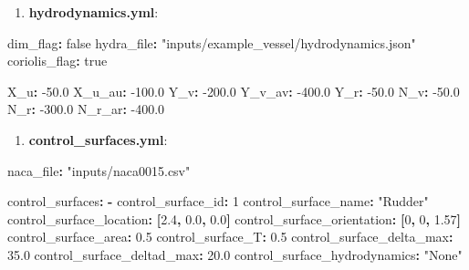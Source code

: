 \documentclass[
  letterpaper,
  DIV=11,
  numbers=noendperiod]{scrreprt}
\newenvironment{Shaded}{\begin{snugshade}}{\end{snugshade}}
\newcommand{\AttributeTok}[1]{\textcolor[rgb]{0.40,0.45,0.13}{#1}}
\newcommand{\CharTok}[1]{\textcolor[rgb]{0.13,0.47,0.30}{#1}}
\newcommand{\DecValTok}[1]{\textcolor[rgb]{0.68,0.00,0.00}{#1}}
\newcommand{\FloatTok}[1]{\textcolor[rgb]{0.68,0.00,0.00}{#1}}
\newcommand{\FunctionTok}[1]{\textcolor[rgb]{0.28,0.35,0.67}{#1}}
\newcommand{\KeywordTok}[1]{\textcolor[rgb]{0.00,0.23,0.31}{\textbf{#1}}}
\newcommand{\StringTok}[1]{\textcolor[rgb]{0.13,0.47,0.30}{#1}}
\providecommand{\tightlist}{%
  \setlength{\itemsep}{0pt}\setlength{\parskip}{0pt}}\usepackage{longtable,booktabs,array}
\begin{document}
\begin{enumerate}
\def\labelenumi{\arabic{enumi}.}
\setcounter{enumi}{3}
\tightlist
\item
  \textbf{hydrodynamics.yml}:
\end{enumerate}

\begin{Shaded}
\begin{Highlighting}[]
\FunctionTok{dim\_flag}\KeywordTok{:}\AttributeTok{ }\CharTok{false}
\FunctionTok{hydra\_file}\KeywordTok{:}\AttributeTok{ }\StringTok{"inputs/example\_vessel/hydrodynamics.json"}
\FunctionTok{coriolis\_flag}\KeywordTok{:}\AttributeTok{ }\CharTok{true}

\FunctionTok{X\_u}\KeywordTok{:}\AttributeTok{ }\FloatTok{{-}50.0}
\FunctionTok{X\_u\_au}\KeywordTok{:}\AttributeTok{ }\FloatTok{{-}100.0}
\FunctionTok{Y\_v}\KeywordTok{:}\AttributeTok{ }\FloatTok{{-}200.0}
\FunctionTok{Y\_v\_av}\KeywordTok{:}\AttributeTok{ }\FloatTok{{-}400.0}
\FunctionTok{Y\_r}\KeywordTok{:}\AttributeTok{ }\FloatTok{{-}50.0}
\FunctionTok{N\_v}\KeywordTok{:}\AttributeTok{ }\FloatTok{{-}50.0}
\FunctionTok{N\_r}\KeywordTok{:}\AttributeTok{ }\FloatTok{{-}300.0}
\FunctionTok{N\_r\_ar}\KeywordTok{:}\AttributeTok{ }\FloatTok{{-}400.0}
\end{Highlighting}
\end{Shaded}

\begin{enumerate}
\def\labelenumi{\arabic{enumi}.}
\setcounter{enumi}{4}
\tightlist
\item
  \textbf{control\_surfaces.yml}:
\end{enumerate}

\begin{Shaded}
\begin{Highlighting}[]
\FunctionTok{naca\_file}\KeywordTok{:}\AttributeTok{ }\StringTok{"inputs/naca0015.csv"}

\FunctionTok{control\_surfaces}\KeywordTok{:}
\AttributeTok{  }\KeywordTok{{-}}\AttributeTok{ }\FunctionTok{control\_surface\_id}\KeywordTok{:}\AttributeTok{ }\DecValTok{1}
\AttributeTok{    }\FunctionTok{control\_surface\_name}\KeywordTok{:}\AttributeTok{ }\StringTok{"Rudder"}
\AttributeTok{    }\FunctionTok{control\_surface\_location}\KeywordTok{:}\AttributeTok{ }\KeywordTok{[}\FloatTok{2.4}\KeywordTok{,}\AttributeTok{ }\FloatTok{0.0}\KeywordTok{,}\AttributeTok{ }\FloatTok{0.0}\KeywordTok{]}
\AttributeTok{    }\FunctionTok{control\_surface\_orientation}\KeywordTok{:}\AttributeTok{ }\KeywordTok{[}\DecValTok{0}\KeywordTok{,}\AttributeTok{ }\DecValTok{0}\KeywordTok{,}\AttributeTok{ }\FloatTok{1.57}\KeywordTok{]}
\AttributeTok{    }\FunctionTok{control\_surface\_area}\KeywordTok{:}\AttributeTok{ }\FloatTok{0.5}
\AttributeTok{    }\FunctionTok{control\_surface\_T}\KeywordTok{:}\AttributeTok{ }\FloatTok{0.5}
\AttributeTok{    }\FunctionTok{control\_surface\_delta\_max}\KeywordTok{:}\AttributeTok{ }\FloatTok{35.0}
\AttributeTok{    }\FunctionTok{control\_surface\_deltad\_max}\KeywordTok{:}\AttributeTok{ }\FloatTok{20.0}
\AttributeTok{    }\FunctionTok{control\_surface\_hydrodynamics}\KeywordTok{:}\AttributeTok{ }\StringTok{"None"}
\end{Highlighting}
\end{Shaded}
\end{document}
